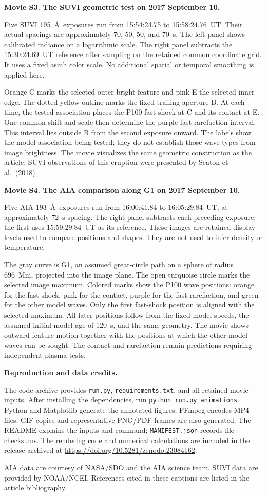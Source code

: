 \documentclass[11pt,letterpaper]{article}
\begin{document}
\newpage
\textbf{Movie S3. The SUVI geometric test on 2017 September 10.}

Five SUVI 195~\AA\ exposures run from 15:54:24.75 to 15:58:24.76~UT.
Their actual spacings are approximately 70, 50, 50, and 70~s.
The left panel shows calibrated radiance on a logarithmic scale.
The right panel subtracts the 15:30:24.69~UT reference after sampling
on the retained common coordinate grid. It uses a fixed asinh color
scale. No additional spatial or temporal smoothing is applied here.

Orange C marks the selected outer bright feature and pink E the
selected inner edge. The dotted yellow outline marks the fixed
trailing aperture B. At each time, the tested association places the
P100 fast shock at C and its contact at E. One common shift and scale
then determine the purple fast-rarefaction interval. This interval
lies outside B from the second exposure onward. The labels show the
model association being tested; they do not establish those wave
types from image brightness. The movie visualizes the same geometric
construction as the article. SUVI observations of this eruption were
presented by Seaton et al.\ (2018).

\textbf{Movie S4. The AIA comparison along G1 on 2017 September 10.}

Five AIA 193~\AA\ exposures run from 16:00:41.84 to 16:05:29.84~UT,
at approximately 72~s spacing. The right panel subtracts each
preceding exposure; the first uses 15:59:29.84~UT as its reference.
These images are retained display levels used to compare positions
and shapes. They are not used to infer density or temperature.

The gray curve is G1, an assumed great-circle path on a sphere of
radius 696~Mm, projected into the image plane. The open turquoise
circle marks the selected image maximum. Colored marks show the P100
wave positions: orange for the fast shock, pink for the contact,
purple for the fast rarefaction, and green for the other model waves.
Only the first fast-shock position is aligned with the selected
maximum. All later positions follow from the fixed model speeds,
the assumed initial model age of 120~s, and the same geometry.
The movie shows outward feature motion together with the positions
at which the other model waves can be sought. The contact and
rarefaction remain predictions requiring independent plasma tests.

\textbf{Reproduction and data credits.}

The code archive provides \texttt{run.py},
\texttt{requirements.txt}, and all retained movie inputs.
After installing the dependencies, run
\texttt{python run.py animations}. Python and Matplotlib generate
the annotated figures; FFmpeg encodes MP4 files. GIF copies and
representative PNG/PDF frames are also generated. The README explains
the inputs and command; \texttt{MANIFEST.json} records file checksums.
The rendering code and numerical calculations are included in the
release archived at
\url{https://doi.org/10.5281/zenodo.23084162}.

AIA data are courtesy of NASA/SDO and the AIA science team.
SUVI data are provided by NOAA/NCEI. References cited in these captions
are listed in the article bibliography.
\end{document}
